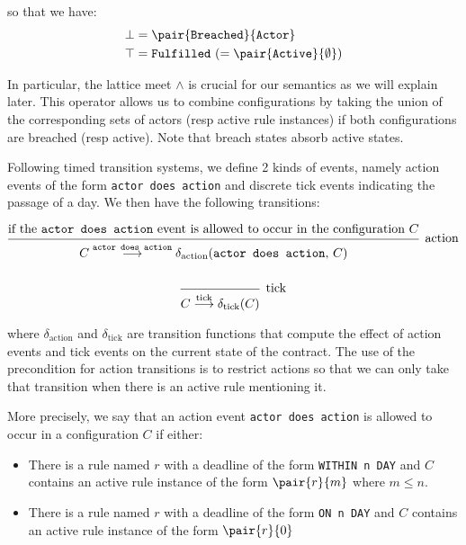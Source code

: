 \documentclass{article}
\begin{document}
so that we have:
\begin{align*}
  \bot & = \pair{\texttt{Breached}}{\texttt{Actor}}
  \\
  \top & = \texttt{Fulfilled} \,\,  (= \pair{\texttt{Active}}{\emptyset})
\end{align*}

In particular, the lattice meet $\wedge$ is crucial for our semantics as we will
explain later.
This operator allows us to combine configurations by taking the union of the
corresponding sets of actors (resp active rule instances) if both
configurations are breached (resp active).
Note that breach states absorb active states.

Following timed transition systems, we define 2 kinds of events, namely action
events of the form \texttt{actor does action} and discrete tick events
indicating the passage of a day.
We then have the following transitions:

\begin{gather*}
  \begin{prooftree}
    \hypo{\text{if the \texttt{actor does action} event is allowed to occur in the configuration } C}
    \infer1[\text{action}]{C \overset{\texttt{actor does action}}{\longrightarrow} \delta_\text{action}(\texttt{actor does action}, \, C)}
  \end{prooftree}
  \\ \\
  \begin{prooftree}
    \infer0[\text{tick}]{C \overset{\text{tick}}{\longrightarrow} \delta_\text{tick}(C)}
  \end{prooftree}
\end{gather*}

where $\delta_\text{action}$ and $\delta_\text{tick}$ are transition functions
that compute the effect of action events and tick events on the current state
of the contract.
The use of the precondition for action transitions is to restrict actions so
that we can only take that transition when there is an active rule mentioning it.

More precisely, we say that an action event \texttt{actor does action} is allowed
to occur in a configuration $C$ if either:

\begin{itemize}
  \item
  There is a rule named $r$ with a deadline of the form
  \texttt{WITHIN n DAY}
  and $C$ contains an active rule instance of the form
  $\pair{r}{m}$ where $m \leq n$.

  \item
  There is a rule named $r$ with a deadline of the form
  \texttt{ON n DAY}
  and $C$ contains an active rule instance of the form
  $\pair{r}{0}$
\end{itemize}
\end{document}
